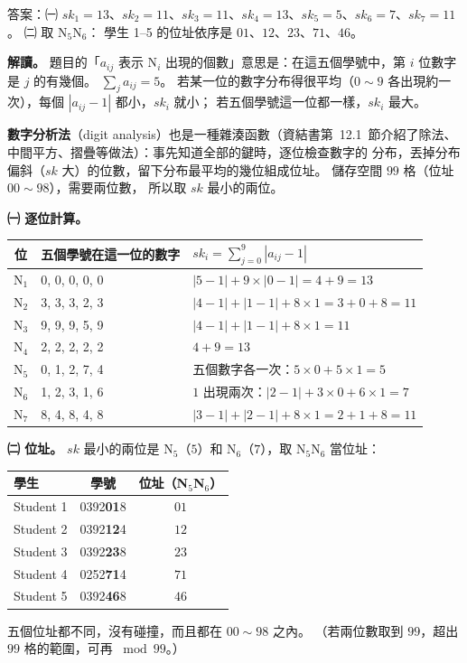 \begin{pastsoln}
答案：㈠ $sk_1 = 13$、$sk_2 = 11$、$sk_3 = 11$、$sk_4 = 13$、$sk_5 = 5$、$sk_6 = 7$、$sk_7 = 11$。 ㈡ 取 N$_5$N$_6$：
學生 1--5 的位址依序是 $01$、$12$、$23$、$71$、$46$。

\textbf{解讀。} 題目的「$a_{ij}$ 表示 N$_i$ 出現的個數」意思是：在這五個學號中，第 $i$ 位數字是 $j$ 的有幾個。
$\sum_j a_{ij} = 5$。 若某一位的數字分布得很平均（$0 \sim 9$ 各出現約一次），每個 $|a_{ij} - 1|$ 都小，$sk_i$ 就小；
若五個學號這一位都一樣，$sk_i$ 最大。

\textbf{數字分析法}（digit analysis）也是一種雜湊函數（資結書第~12.1~節介紹了除法、中間平方、摺疊等做法）：事先知道全部的鍵時，逐位檢查數字的
分布，丟掉分布偏斜（$sk$ 大）的位數，留下分布最平均的幾位組成位址。 儲存空間 $99$ 格（位址 $00 \sim 98$），需要兩位數，
所以取 $sk$ 最小的兩位。

\textbf{㈠ 逐位計算。}
\begin{center}
\begin{tabular}{cll}
\toprule
位 & 五個學號在這一位的數字 & $sk_i = \sum_{j=0}^{9} |a_{ij} - 1|$ \\
\midrule
N$_1$ & 0, 0, 0, 0, 0 & $|5 - 1| + 9 \times |0 - 1| = 4 + 9 = 13$ \\
N$_2$ & 3, 3, 3, 2, 3 & $|4 - 1| + |1 - 1| + 8 \times 1 = 3 + 0 + 8 = 11$ \\
N$_3$ & 9, 9, 9, 5, 9 & $|4 - 1| + |1 - 1| + 8 \times 1 = 11$ \\
N$_4$ & 2, 2, 2, 2, 2 & $4 + 9 = 13$ \\
N$_5$ & 0, 1, 2, 7, 4 & 五個數字各一次：$5 \times 0 + 5 \times 1 = 5$ \\
N$_6$ & 1, 2, 3, 1, 6 & $1$ 出現兩次：$|2 - 1| + 3 \times 0 + 6 \times 1 = 7$ \\
N$_7$ & 8, 4, 8, 4, 8 & $|3 - 1| + |2 - 1| + 8 \times 1 = 2 + 1 + 8 = 11$ \\
\bottomrule
\end{tabular}
\end{center}

\textbf{㈡ 位址。} $sk$ 最小的兩位是 N$_5$（$5$）和 N$_6$（$7$），取 N$_5$N$_6$ 當位址：
\begin{center}
\begin{tabular}{lcc}
\toprule
學生 & 學號 & 位址（N$_5$N$_6$） \\
\midrule
Student 1 & 0392\textbf{01}8 & $01$ \\
Student 2 & 0392\textbf{12}4 & $12$ \\
Student 3 & 0392\textbf{23}8 & $23$ \\
Student 4 & 0252\textbf{71}4 & $71$ \\
Student 5 & 0392\textbf{46}8 & $46$ \\
\bottomrule
\end{tabular}
\end{center}
五個位址都不同，沒有碰撞，而且都在 $00 \sim 98$ 之內。 （若兩位數取到 $99$，超出 $99$ 格的範圍，可再 $\bmod 99$。）
\end{pastsoln}
